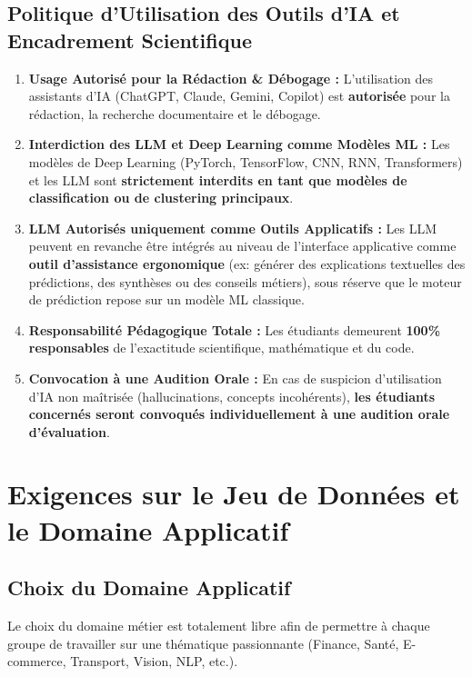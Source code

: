 \documentclass[11pt,a4paper]{article}
\begin{document}
\subsection{Politique d'Utilisation des Outils d'IA et Encadrement Scientifique}
\begin{tcolorbox}[colback=sintefblue!10, colframe=sintefblue, title=\textbf{POLITIQUE D'USAGE DES OUTILS D'IA ET DISTINCTION ML VS IA APPLICATIVE}, arc=2mm]
    \begin{enumerate}[leftmargin=*]
        \item \textbf{Usage Autorisé pour la Rédaction \& Débogage :} L'utilisation des assistants d'IA (ChatGPT, Claude, Gemini, Copilot) est \textbf{autorisée} pour la rédaction, la recherche documentaire et le débogage.
        \item \textbf{Interdiction des LLM et Deep Learning comme Modèles ML :} Les modèles de Deep Learning (PyTorch, TensorFlow, CNN, RNN, Transformers) et les LLM sont \textbf{strictement interdits en tant que modèles de classification ou de clustering principaux}.
        \item \textbf{LLM Autorisés uniquement comme Outils Applicatifs :} Les LLM peuvent en revanche être intégrés au niveau de l'interface applicative comme \textbf{outil d'assistance ergonomique} (ex: générer des explications textuelles des prédictions, des synthèses ou des conseils métiers), sous réserve que le moteur de prédiction repose sur un modèle ML classique.
        \item \textbf{Responsabilité Pédagogique Totale :} Les étudiants demeurent \textbf{100\% responsables} de l'exactitude scientifique, mathématique et du code.
        \item \textbf{Convocation à une Audition Orale :} En cas de suspicion d'utilisation d'IA non maîtrisée (hallucinations, concepts incohérents), \textbf{les étudiants concernés seront convoqués individuellement à une audition orale d'évaluation}.
    \end{enumerate}
\end{tcolorbox}

\section{Exigences sur le Jeu de Données et le Domaine Applicatif}

\subsection{Choix du Domaine Applicatif}
Le choix du domaine métier est totalement libre afin de permettre à chaque groupe de travailler sur une thématique passionnante (Finance, Santé, E-commerce, Transport, Vision, NLP, etc.).
\end{document}
